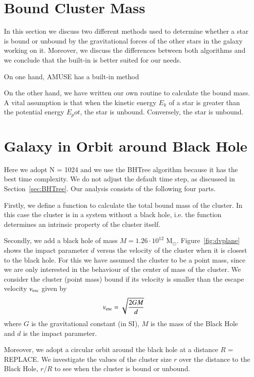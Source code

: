\documentclass{aa}
\newcommand{\Sun}[0]{\ensuremath{_{\odot}}}
\begin{document}
\section{Bound Cluster Mass}
In this section we discuss two different methods used to determine whether a star is bound or unbound by the gravitational forces of the other stars in the galaxy working on it. Moreover, we discuss the differences between both algorithms and we conclude that the built-in is better suited for our needs.

On one hand, AMUSE has a built-in method \citep{1998ApJ...498..137E}

On the other hand, we have written our own routine to calculate the bound mass. A vital assumption is that when the kinetic energy $E_k$ of a star is greater than the potential energy $E_pot$, the star is unbound. Conversely, the star is unbound.
  
\section{Galaxy in Orbit around Black Hole} \label{sec:orbitBH_MW_Mass}
Here we adopt N = 1024 and we use the BHTree algorithm because it has the best time complexity. We do not adjust the default time step, as discussed in Section~\ref{sec:BHTree}. Our analysis consists of the following four parts. 

Firstly, we define a function to calculate the total bound mass of the cluster. In this case the cluster is in a system without a black hole, i.e. the function determines an intrinsic property of the cluster itself. 

Secondly, we add a black hole of mass $M = 1.26 \cdot 10^{12}$ M\Sun. Figure~\ref{fig:dvplane} shows the impact parameter $d$ versus the velocity of the cluster when it is closest to the black hole. For this we have assumed the cluster to be a point mass, since we are only interested in the behaviour of the center of mass of the cluster. We consider the cluster (point mass) bound if its velocity is smaller than the escape velocity $v_{\rm esc}$ given by \begin{eqnarray} v_{\rm esc} &= \sqrt{\frac{2 G M}{d}} \label{eq:vesc} \end{eqnarray} where $G$ is the gravitational constant (in SI), $M$ is the mass of the Black Hole and $d$ is the impact parameter.

Moreover, we adopt a circular orbit around the black hole at a distance $R$ = REPLACE. We investigate the values of the cluster size $r$ over the distance to the Black Hole, $r/R$ to see when the cluster is bound or unbound. 
\end{document}
